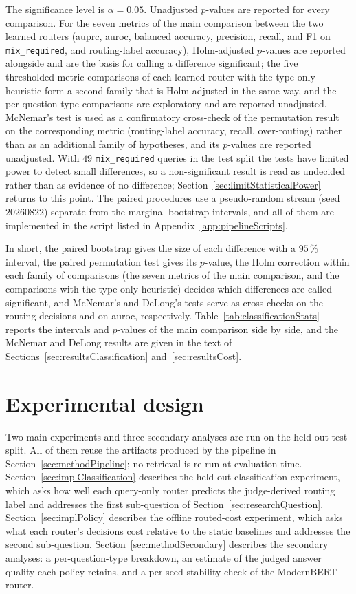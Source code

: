\documentclass[english, bibtex]{kththesis}               %
\numberwithin{listing}{chapter}
\begin{document}
The significance level is $\alpha = 0.05$. Unadjusted $p$-values are reported for every comparison. For the seven metrics of the main comparison between the two learned routers (\gls{auprc}, \gls{auroc}, balanced accuracy, precision, recall, and F1 on \texttt{mix\_required}, and routing-label accuracy), Holm-adjusted $p$-values \cite{holm1979} are reported alongside and are the basis for calling a difference significant; the five thresholded-metric comparisons of each learned router with the type-only heuristic form a second family that is Holm-adjusted in the same way, and the per-question-type comparisons are exploratory and are reported unadjusted. McNemar's test is used as a confirmatory cross-check of the permutation result on the corresponding metric (routing-label accuracy, recall, over-routing) rather than as an additional family of hypotheses, and its $p$-values are reported unadjusted. With $49$ \texttt{mix\_required} queries in the test split the tests have limited power to detect small differences, so a non-significant result is read as undecided rather than as evidence of no difference; Section~\ref{sec:limitStatisticalPower} returns to this point. The paired procedures use a pseudo-random stream (seed $20260822$) separate from the marginal bootstrap intervals, and all of them are implemented in the script listed in Appendix~\ref{app:pipelineScripts}.

In short, the paired bootstrap gives the size of each difference with a $95\,\%$ interval, the paired permutation test gives its $p$-value, the Holm correction within each family of comparisons (the seven metrics of the main comparison, and the comparisons with the type-only heuristic) decides which differences are called significant, and McNemar's and DeLong's tests serve as cross-checks on the routing decisions and on \gls{auroc}, respectively. Table~\ref{tab:classificationStats} reports the intervals and $p$-values of the main comparison side by side, and the McNemar and DeLong results are given in the text of Sections~\ref{sec:resultsClassification} and~\ref{sec:resultsCost}.

\section{Experimental design}
\label{sec:methodExperiments}

Two main experiments and three secondary analyses are run on the held-out test split. All of them reuse the artifacts produced by the pipeline in Section~\ref{sec:methodPipeline}; no retrieval is re-run at evaluation time. Section~\ref{sec:implClassification} describes the held-out classification experiment, which asks how well each query-only router predicts the judge-derived routing label and addresses the first sub-question of Section~\ref{sec:researchQuestion}. Section~\ref{sec:implPolicy} describes the offline routed-cost experiment, which asks what each router's decisions cost relative to the static baselines and addresses the second sub-question. Section~\ref{sec:methodSecondary} describes the secondary analyses: a per-question-type breakdown, an estimate of the judged answer quality each policy retains, and a per-seed stability check of the ModernBERT router.
\end{document}
